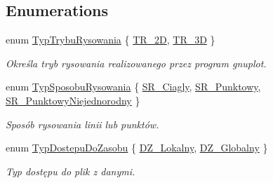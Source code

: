 \subsection*{Enumerations}
\begin{DoxyCompactItemize}
\item 
enum \mbox{\hyperlink{namespace_pz_g_aef59d70a0ee2eab473790613c3628944}{Typ\+Trybu\+Rysowania}} \{ \mbox{\hyperlink{namespace_pz_g_aef59d70a0ee2eab473790613c3628944a5eb0cf8b3405e136f092efdb489d60c4}{T\+R\+\_\+2D}}, 
\mbox{\hyperlink{namespace_pz_g_aef59d70a0ee2eab473790613c3628944a856e6b0fa6b8a9dc184c60cf27dcc5d2}{T\+R\+\_\+3D}}
 \}
\begin{DoxyCompactList}\small\item\em Określa tryb rysowania realizowanego przez program {\ttfamily gnuplot}. \end{DoxyCompactList}\item 
enum \mbox{\hyperlink{namespace_pz_g_a53d89f50686ddd39301f9706cc1247dc}{Typ\+Sposobu\+Rysowania}} \{ \mbox{\hyperlink{namespace_pz_g_a53d89f50686ddd39301f9706cc1247dca22656aba69ada1776d9522ff83f70546}{S\+R\+\_\+\+Ciagly}}, 
\mbox{\hyperlink{namespace_pz_g_a53d89f50686ddd39301f9706cc1247dca307cba9b5669189418e9d595f0cc83a4}{S\+R\+\_\+\+Punktowy}}, 
\mbox{\hyperlink{namespace_pz_g_a53d89f50686ddd39301f9706cc1247dca9c1082d7a4a130423bc49dd41e257317}{S\+R\+\_\+\+Punktowy\+Niejednorodny}}
 \}
\begin{DoxyCompactList}\small\item\em Sposób rysowania linii lub punktów. \end{DoxyCompactList}\item 
enum \mbox{\hyperlink{namespace_pz_g_af74528dea7061dcb07cf44f315703cf4}{Typ\+Dostepu\+Do\+Zasobu}} \{ \mbox{\hyperlink{namespace_pz_g_af74528dea7061dcb07cf44f315703cf4ab239a07233614b519b0f2f5ca8af7826}{D\+Z\+\_\+\+Lokalny}}, 
\mbox{\hyperlink{namespace_pz_g_af74528dea7061dcb07cf44f315703cf4a21d511d2fe6c4e27e30ebe255405e6d9}{D\+Z\+\_\+\+Globalny}}
 \}
\begin{DoxyCompactList}\small\item\em Typ dostępu do plik z danymi. \end{DoxyCompactList}\end{DoxyCompactItemize}
